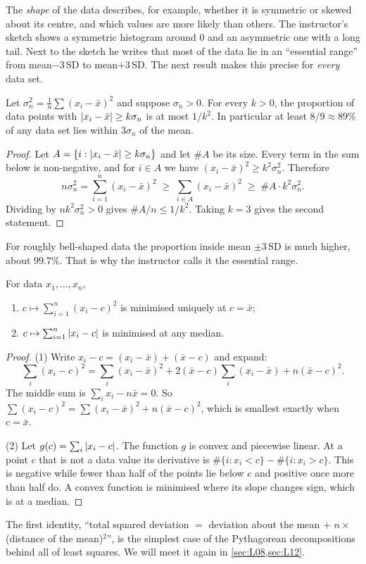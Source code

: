 The \emph{shape} of the data describes, for example, whether it is symmetric or skewed about its
centre, and which values are more likely than others. The instructor's sketch shows a
symmetric histogram around $0$ and an asymmetric one with a long tail. Next to the sketch he
writes that most of the data lie in an ``essential range'' from mean$-3\,$SD to mean$+3\,$SD.
The next result makes this precise for \emph{every} data set.

\begin{proposition}\label{prop:L01-cheb}
Let $\sigma_n^2=\frac1n\sum (x_i-\bar x)^2$ and suppose $\sigma_n>0$. For every $k>0$, the proportion of data points with
$\left|x_i-\bar x\right|\ge k\sigma_n$ is at most $1/k^2$. In particular at least $8/9\approx 89\%$ of any
data set lies within $3\sigma_n$ of the mean.
\end{proposition}
\begin{proof}
Let $A=\{i:\left|x_i-\bar x\right|\ge k\sigma_n\}$ and let $\# A$ be its size. Every term in the sum below
is non-negative, and for $i\in A$ we have $(x_i-\bar x)^2\ge k^2\sigma_n^2$. Therefore
\[
n\sigma_n^2=\sum_{i=1}^n (x_i-\bar x)^2 \;\ge\; \sum_{i\in A}(x_i-\bar x)^2\;\ge\; \#A\cdot k^2\sigma_n^2 .
\]
Dividing by $nk^2\sigma_n^2>0$ gives $\#A/n\le 1/k^2$. Taking $k=3$ gives the second statement.
\end{proof}

For roughly bell-shaped data the proportion inside mean $\pm 3\,$SD is much higher, about
$99.7\%$. That is why the instructor calls it the essential range.

\begin{proposition}\label{prop:L01-bestconst}
For data $x_1,\dots,x_n$,
\begin{enumerate}
  \item $c\mapsto\sum_{i=1}^n (x_i-c)^2$ is minimised uniquely at $c=\bar x$;
  \item $c\mapsto\sum_{i=1}^n \left|x_i-c\right|$ is minimised at any median.
\end{enumerate}
\end{proposition}
\begin{proof}
(1) Write $x_i-c=(x_i-\bar x)+(\bar x-c)$ and expand:
\[
\sum_{i}(x_i-c)^2=\sum_i (x_i-\bar x)^2 + 2(\bar x-c)\sum_i (x_i-\bar x) + n(\bar x-c)^2 .
\]
The middle sum is $\sum_i x_i - n\bar x=0$. So $\sum(x_i-c)^2=\sum(x_i-\bar x)^2+n(\bar x-c)^2$,
which is smallest exactly when $c=\bar x$.

(2) Let $g(c)=\sum_i\left|x_i-c\right|$. The function $g$ is convex and piecewise linear. At a point $c$
that is not a data value its derivative is $\#\{i:x_i<c\}-\#\{i:x_i>c\}$. This is negative while
fewer than half of the points lie below $c$ and positive once more than half do. A convex
function is minimised where its slope changes sign, which is at a median.
\end{proof}
The first identity, ``total squared deviation $=$ deviation about the mean $+$ $n\times$(distance
of the mean)$^2$'', is the simplest case of the Pythagorean decompositions behind all of least
squares. We will meet it again in \cref{sec:L08,sec:L12}.

